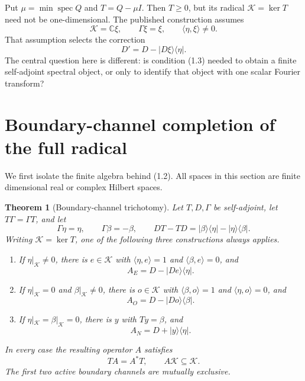 \documentclass[11pt]{article}
\newtheorem{theorem}{Theorem}[section]
\numberwithin{equation}{section}
\theoremstyle{definition}
\theoremstyle{remark}
\newcommand{\C}{\mathbb C}
\newcommand{\K}{\mathcal K}
\newcommand{\kerop}{\operatorname{ker}}
\newcommand{\spec}{\operatorname{spec}}
\begin{document}
Put $\mu=\min\spec Q$ and $T=Q-\mu I$.  Then $T\ge0$, but its radical
$\K=\kerop T$ need not be one-dimensional.  The published construction assumes
\begin{equation}
 \K=\C\xi,\qquad \Gamma\xi=\xi,\qquad
 \langle\eta,\xi\rangle\ne0.
\end{equation}
That assumption selects the correction
\[
 D'=D-|D\xi\rangle\langle\eta|.
\]
The central question here is different: is condition (1.3) needed to obtain a finite
self-adjoint spectral object, or only to identify that object with one scalar Fourier transform?

\section{Boundary-channel completion of the full radical}

We first isolate the finite algebra behind (1.2).  All spaces in this section are finite
dimensional real or complex Hilbert spaces.

\begin{theorem}[Boundary-channel trichotomy]
\label{thm:completion}
Let $T,D,\Gamma$ be self-adjoint, let $T\Gamma=\Gamma T$, and let
\[
 \Gamma\eta=\eta,\qquad \Gamma\beta=-\beta,
 \qquad DT-TD=|\beta\rangle\langle\eta|-|\eta\rangle\langle\beta|.
\]
Writing $\K=\kerop T$, one of the following three constructions always applies.
\begin{enumerate}
\item If $\eta|_{\K}\ne0$, there is $e\in\K$ with
      $\langle\eta,e\rangle=1$ and $\langle\beta,e\rangle=0$, and
      \[
      A_E=D-|De\rangle\langle\eta|.
      \]
\item If $\eta|_{\K}=0$ and $\beta|_{\K}\ne0$, there is $o\in\K$ with
      $\langle\beta,o\rangle=1$ and $\langle\eta,o\rangle=0$, and
      \[
      A_O=D-|Do\rangle\langle\beta|.
      \]
\item If $\eta|_{\K}=\beta|_{\K}=0$, there is $y$ with $Ty=\beta$, and
      \[
      A_N=D+|y\rangle\langle\eta|.
      \]
\end{enumerate}
In every case the resulting operator $A$ satisfies
\begin{equation}
                         TA=A^*T,
              \qquad A\K\subseteq\K.
\end{equation}
The first two active boundary channels are mutually exclusive.
\end{theorem}
\end{document}

